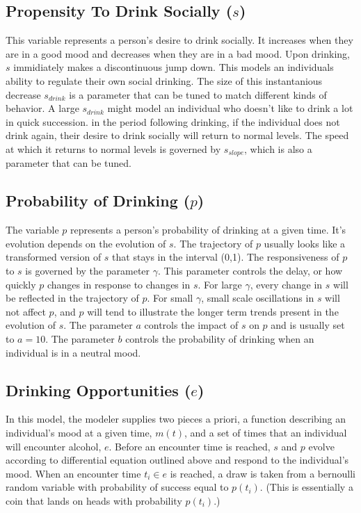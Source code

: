 \documentclass{journal}
\theoremstyle{definition}
\begin{document}
\subsection*{Propensity To Drink Socially ($s$)}

This variable represents a person's desire to drink socially. It increases when they are in a good mood and decreases when they are in a bad mood. Upon drinking, $s$ immidiately makes a discontinuous jump down. This models an individuals ability to regulate their own social drinking. The size of this instantanious decrease $s_{drink}$ is a parameter that can be tuned to match different kinds of behavior. A large $s_{drink}$ might model an individual who doesn't like to drink a lot in quick succession. in the period following drinking, if the individual does not drink again, their desire to drink socially will return to normal levels. The speed at which it returns to normal levels is governed by $s_{slope}$, which is also a parameter that can be tuned.

\subsection*{Probability of Drinking ($p$)}

The variable $p$ represents a person's probability of drinking at a given time. It's evolution depends on the evolution of $s$. The trajectory of $p$ usually looks like a transformed version of $s$ that stays in the interval (0,1). The responsiveness of $p$ to $s$ is governed by the parameter $\gamma$. This parameter controls the delay, or how quickly $p$ changes in response to changes in $s$. For large $\gamma$, every change in $s$ will be reflected in the trajectory of $p$. For small $\gamma$, small scale oscillations in $s$ will not affect $p$, and $p$ will tend to illustrate the longer term trends present in the evolution of $s$. The parameter $a$ controls the impact of $s$ on $p$ and is usually set to $a=10$. The parameter $b$ controls the probability of drinking when an individual is in a neutral mood.

\subsection*{Drinking Opportunities ($e$)}

In this model, the modeler supplies two pieces a priori, a function describing an individual's mood at a given time, $m(t)$, and a set of times that an individual will encounter alcohol, $e$. Before an encounter time is reached, $s$ and $p$ evolve according to differential equation outlined above and respond to the individual's mood. When an encounter time $t_i \in e$ is reached, a draw is taken from a bernoulli random variable with probability of success equal to $p(t_i)$. (This is essentially a coin that lands on heads with probability $p(t_i)$.)
\end{document}
